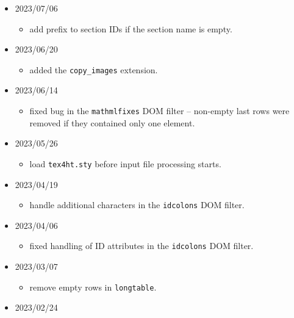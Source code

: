 \begin{itemize}
  \begin{itemize}
  \tightlist
  \item
    remove unnecessary \texttt{\textless{}a\textgreater{}} elements with
    \texttt{id} attributes and set the \texttt{id} on the parent.
  \end{itemize}
\item
  2023/07/06

  \begin{itemize}
  \tightlist
  \item
    add prefix to section IDs if the section name is empty.
  \end{itemize}
\item
  2023/06/20

  \begin{itemize}
  \tightlist
  \item
    added the \texttt{copy\_images} extension.
  \end{itemize}
\item
  2023/06/14

  \begin{itemize}
  \tightlist
  \item
    fixed bug in the \texttt{mathmlfixes} DOM filter -- non-empty last
    rows were removed if they contained only one element.
  \end{itemize}
\item
  2023/05/26

  \begin{itemize}
  \tightlist
  \item
    load \texttt{tex4ht.sty} before input file processing starts.
  \end{itemize}
\item
  2023/04/19

  \begin{itemize}
  \tightlist
  \item
    handle additional characters in the \texttt{idcolons} DOM filter.
  \end{itemize}
\item
  2023/04/06

  \begin{itemize}
  \tightlist
  \item
    fixed handling of ID attributes in the \texttt{idcolons} DOM filter.
  \end{itemize}
\item
  2023/03/07

  \begin{itemize}
  \tightlist
  \item
    remove empty rows in \texttt{longtable}.
  \end{itemize}
\item
  2023/02/24


\end{itemize}
